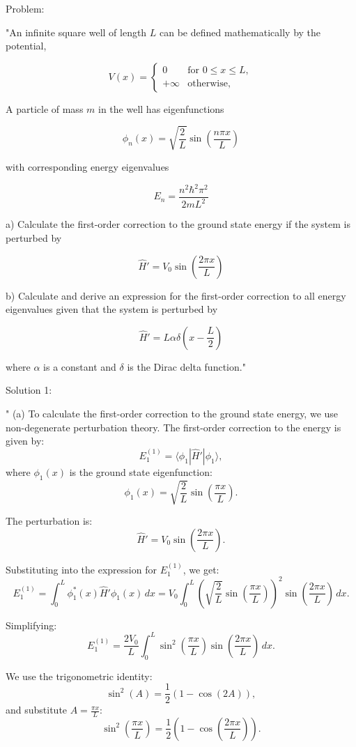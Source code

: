 Problem:

"An infinite square well of length \( L \) can be defined mathematically by the potential,

\[ V(x) = \begin{cases}
0 & \text{for } 0 \leq x \leq L,\\
+\infty  & \text{otherwise,} 
\end{cases} \]

A particle of mass \( m \) in the well has eigenfunctions

\[ \phi_{n}(x) = \sqrt{\frac{2}{L}} \sin\left(\frac{n \pi x}{L} \right) \]

with corresponding energy eigenvalues 

\[ E_{n} = \frac{n^{2}\hbar^{2}\pi^{2}}{2mL^{2}} \]

a) Calculate the first-order correction to the ground state energy if the system is perturbed by 

\[ \hat{H}' = V_{0} \sin\left(\frac{2 \pi x}{L} \right) \]

b) Calculate and derive an expression for the first-order correction to all energy eigenvalues given that the system is perturbed by 

\[ \hat{H}' = L\alpha \delta\left(x - \frac{L}{2} \right) \]

where \( \alpha \) is a constant and \( \delta \) is the Dirac delta function."

Solution 1: 

"
(a) To calculate the first-order correction to the ground state energy, we use non-degenerate perturbation theory. The first-order correction to the energy is given by:
\[
E_1^{(1)} = \langle \phi_1 | \hat{H}' | \phi_1 \rangle,
\]
where \(\phi_1(x)\) is the ground state eigenfunction:
\[
\phi_1(x) = \sqrt{\frac{2}{L}} \sin\left(\frac{\pi x}{L}\right).
\]

The perturbation is:
\[
\hat{H}' = V_0 \sin\left(\frac{2\pi x}{L}\right).
\]

Substituting into the expression for \(E_1^{(1)}\), we get:
\[
E_1^{(1)} = \int_0^L \phi_1^*(x) \hat{H}' \phi_1(x) \, dx = V_0 \int_0^L \left(\sqrt{\frac{2}{L}} \sin\left(\frac{\pi x}{L}\right)\right)^2 \sin\left(\frac{2\pi x}{L}\right) \, dx.
\]

Simplifying:
\[
E_1^{(1)} = \frac{2V_0}{L} \int_0^L \sin^2\left(\frac{\pi x}{L}\right) \sin\left(\frac{2\pi x}{L}\right) \, dx.
\]

We use the trigonometric identity:
\[
\sin^2(A) = \frac{1}{2} \left(1 - \cos(2A)\right),
\]
and substitute \(A = \frac{\pi x}{L}\):
\[
\sin^2\left(\frac{\pi x}{L}\right) = \frac{1}{2} \left(1 - \cos\left(\frac{2\pi x}{L}\right)\right).
\]


